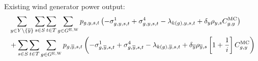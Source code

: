 \documentclass{article}
\begin{document}
Existing wind generator power output:
\begin{align}
	& \sum\limits_{\iYear \in \sYears 
		\setminus \{\iYearTerminal\}
	}\sum\limits_{\iScenario \in \sScenarios}\sum\limits_{\iInterval \in \sIntervals} \sum\limits_{\iGenerator \in \sGeneratorsExistingWind} \vPower\left(-\dMinPowerOutput + \dMaxPowerOutputWindExisting
	- \dPowerBalance[k(\iGenerator),\iYear,\iScenario,\iInterval] + \cDiscountRate \cScenarioDuration\cMarginalCost
	\right)\nonumber\\
	& + \sum\limits_{\iScenario \in \sScenarios} \sum\limits_{\iInterval \in \sIntervals} \sum\limits_{\iGenerator \in \sGeneratorsExistingWind} \vPower[\iGenerator,\iYearTerminal,\iScenario,\iInterval] \left(-\dMinPowerOutput[\iGenerator,\iYearTerminal,\iScenario,\iInterval] + \dMaxPowerOutputWindExisting[\iGenerator,\iYearTerminal,\iScenario,\iInterval] - \dPowerBalance[k(\iGenerator),\iYearTerminal,\iScenario,\iInterval] + \cDiscountRate[\iYearTerminal] \cScenarioDuration[\iYearTerminal,\iScenario] \left[1 + \frac{1}{\cInterestRate}\right] \cMarginalCost \right)\\\nonumber
\end{align}
\end{document}
